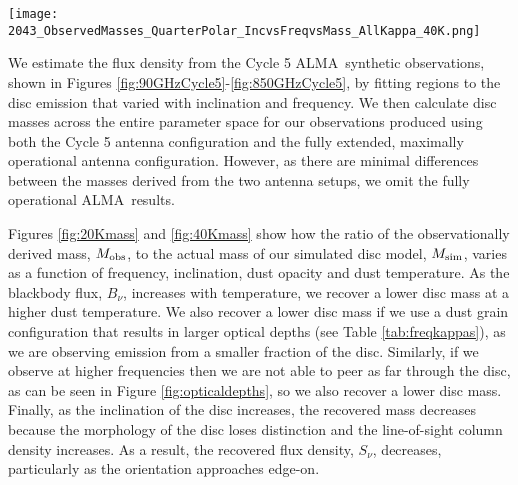 \documentclass[fleqn,usenatbib]{mnras}
\newcommand{\alma}{ALMA}
\begin{document}
\begin{figure*}
    \texttt{[image: 2043\_ObservedMasses\_QuarterPolar\_IncvsFreqvsMass\_AllKappa\_40K.png]}
    \caption{Same as Figure \ref{fig:20Kmass} but assuming a constant dust temperature of 40\,K.}
    \label{fig:40Kmass}
\end{figure*}

We estimate the flux density from the Cycle 5 \alma\ synthetic observations, shown in Figures \ref{fig:90GHzCycle5}-\ref{fig:850GHzCycle5}, by fitting regions to the disc emission that varied with inclination and frequency. We then calculate disc masses across the entire parameter space for our observations produced using both the Cycle 5 antenna configuration and the fully extended, maximally operational antenna configuration. However, as there are minimal differences between the masses derived from the two antenna setups, we omit the fully operational \alma\ results.
\smallskip

Figures \ref{fig:20Kmass} and \ref{fig:40Kmass} show how the ratio of the observationally derived mass, $M_{\rm obs}$, to the actual mass of our simulated disc model, $M_{\rm sim}$, varies as a function of frequency, inclination, dust opacity and dust temperature. As the blackbody flux, $B_\nu$, increases with temperature, we recover a lower disc mass at a higher dust temperature. We also recover a lower disc mass if we use a dust grain configuration that results in larger optical depths (see Table \ref{tab:freqkappas}), as we are observing emission from a smaller fraction of the disc. Similarly, if we observe at higher frequencies then we are not able to peer as far through the disc, as can be seen in Figure \ref{fig:opticaldepths}, so we also recover a lower disc mass. Finally, as the inclination of the disc increases, the recovered mass decreases because the morphology of the disc loses distinction and the line-of-sight column density increases. As a result, the recovered flux density, $S_\nu$, decreases, particularly as the orientation approaches edge-on.

\smallskip
\end{document}
